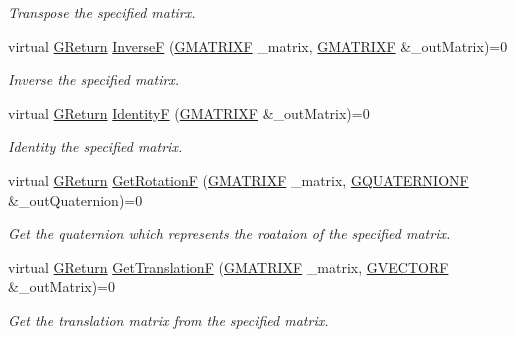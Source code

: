 \begin{DoxyCompactItemize}
\begin{DoxyCompactList}\small\item\em Transpose the specified matirx. \end{DoxyCompactList}\item 
virtual \mbox{\hyperlink{namespace_g_w_a67a839e3df7ea8a5c5686613a7a3de21}{G\+Return}} \mbox{\hyperlink{class_g_w_1_1_m_a_t_h_1_1_g_matrix_a47cbc24d8a15f8cf605f6585c8b44e2e}{InverseF}} (\mbox{\hyperlink{struct_g_w_1_1_m_a_t_h_1_1_g_m_a_t_r_i_x_f}{G\+M\+A\+T\+R\+I\+XF}} \+\_\+matrix, \mbox{\hyperlink{struct_g_w_1_1_m_a_t_h_1_1_g_m_a_t_r_i_x_f}{G\+M\+A\+T\+R\+I\+XF}} \&\+\_\+out\+Matrix)=0
\begin{DoxyCompactList}\small\item\em Inverse the specified matirx. \end{DoxyCompactList}\item 
virtual \mbox{\hyperlink{namespace_g_w_a67a839e3df7ea8a5c5686613a7a3de21}{G\+Return}} \mbox{\hyperlink{class_g_w_1_1_m_a_t_h_1_1_g_matrix_aee68de35de388c5893b6fcdd450dd1d3}{IdentityF}} (\mbox{\hyperlink{struct_g_w_1_1_m_a_t_h_1_1_g_m_a_t_r_i_x_f}{G\+M\+A\+T\+R\+I\+XF}} \&\+\_\+out\+Matrix)=0
\begin{DoxyCompactList}\small\item\em Identity the specified matrix. \end{DoxyCompactList}\item 
virtual \mbox{\hyperlink{namespace_g_w_a67a839e3df7ea8a5c5686613a7a3de21}{G\+Return}} \mbox{\hyperlink{class_g_w_1_1_m_a_t_h_1_1_g_matrix_a1c9745c2b04e1ab4d4446d65c5f0fb89}{Get\+RotationF}} (\mbox{\hyperlink{struct_g_w_1_1_m_a_t_h_1_1_g_m_a_t_r_i_x_f}{G\+M\+A\+T\+R\+I\+XF}} \+\_\+matrix, \mbox{\hyperlink{struct_g_w_1_1_m_a_t_h_1_1_g_q_u_a_t_e_r_n_i_o_n_f}{G\+Q\+U\+A\+T\+E\+R\+N\+I\+O\+NF}} \&\+\_\+out\+Quaternion)=0
\begin{DoxyCompactList}\small\item\em Get the quaternion which represents the roataion of the specified matrix. \end{DoxyCompactList}\item 
virtual \mbox{\hyperlink{namespace_g_w_a67a839e3df7ea8a5c5686613a7a3de21}{G\+Return}} \mbox{\hyperlink{class_g_w_1_1_m_a_t_h_1_1_g_matrix_a5948489188390e3566f7a0fcba687c97}{Get\+TranslationF}} (\mbox{\hyperlink{struct_g_w_1_1_m_a_t_h_1_1_g_m_a_t_r_i_x_f}{G\+M\+A\+T\+R\+I\+XF}} \+\_\+matrix, \mbox{\hyperlink{struct_g_w_1_1_m_a_t_h_1_1_g_v_e_c_t_o_r_f}{G\+V\+E\+C\+T\+O\+RF}} \&\+\_\+out\+Matrix)=0
\begin{DoxyCompactList}\small\item\em Get the translation matrix from the specified matrix. \end{DoxyCompactList}\item 

\end{DoxyCompactItemize}
